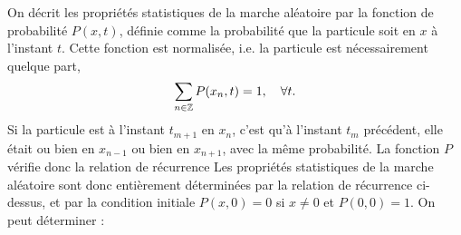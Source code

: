 \documentclass[12pt,fancy]{cours}
\begin{document}
On décrit les propriétés statistiques de la marche aléatoire par la fonction de probabilité $P(x,t)$, définie comme la probabilité que la particule soit en $x$ à l'instant $t$. Cette fonction est normalisée, i.e.  la particule est nécessairement quelque part,
\begin{equation}
\sum_{n \in \mathbb{Z}} P(x_n,t) = 1, \quad \forall t.
\end{equation}
Si la particule est à l'instant $t_{m+1}$ en $x_{n}$, c'est qu'à l'instant  $t_{m}$ précédent, elle était ou bien en $x_{n-1}$ ou bien en $x_{n+1}$, avec la même probabilité. La fonction $P$ vérifie donc la relation de récurrence
Les propriétés statistiques de la marche aléatoire sont donc entièrement déterminées par la relation de récurrence ci-dessus, et par la condition initiale $P(x,0) = 0$  si $x \neq 0$ et $P(0,0) = 1$. On peut déterminer :
\end{document}
